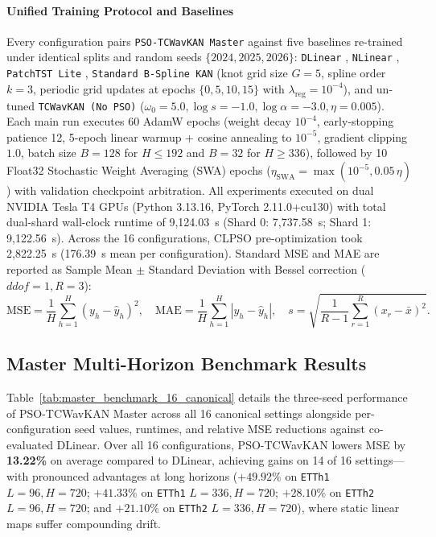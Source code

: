 \documentclass[pdflatex,sn-mathphys-num,referee,lineno]{sn-jnl}
\theoremstyle{thmstyleone}
\theoremstyle{thmstyletwo}
\theoremstyle{thmstylethree}
\begin{document}
\paragraph{Unified Training Protocol and Baselines}
Every configuration pairs \texttt{PSO-TCWavKAN Master} against five baselines re-trained under identical splits and random seeds $\{2024, 2025, 2026\}$: \texttt{DLinear} \cite{zeng2023dlinear}, \texttt{NLinear} \cite{zeng2023dlinear}, \texttt{PatchTST Lite} \cite{nie2023patchtst}, \texttt{Standard B-Spline KAN} (knot grid size $G=5$, spline order $k=3$, periodic grid updates at epochs $\{0, 5, 10, 15\}$ with $\lambda_{\mathrm{reg}}=10^{-4}$), and un-tuned \texttt{TCWavKAN (No PSO)} ($\omega_0=5.0, \log s=-1.0, \log\alpha=-3.0, \eta=0.005$). Each main run executes 60 AdamW epochs \cite{loshchilov2019adamw} (weight decay $10^{-4}$, early-stopping patience 12, 5-epoch linear warmup + cosine annealing to $10^{-5}$, gradient clipping $1.0$, batch size $B=128$ for $H \le 192$ and $B=32$ for $H \ge 336$), followed by 10 Float32 Stochastic Weight Averaging (SWA) epochs \cite{izmailov2018swa} ($\eta_{\mathrm{SWA}} = \max(10^{-5}, 0.05\,\eta)$) with validation checkpoint arbitration. All experiments executed on dual NVIDIA Tesla T4 GPUs (Python 3.13.16, PyTorch 2.11.0+cu130) with total dual-shard wall-clock runtime of 9,124.03~s (Shard 0: 7,737.58~s; Shard 1: 9,122.56~s). Across the 16 configurations, CLPSO pre-optimization took 2,822.25~s (176.39~s mean per configuration). Standard MSE and MAE are reported as Sample Mean $\pm$ Standard Deviation with Bessel correction ($ddof=1, R=3$):
\begin{equation}
\mathrm{MSE} = \frac{1}{H} \sum_{h=1}^H (y_h - \hat{y}_h)^2, \quad \mathrm{MAE} = \frac{1}{H} \sum_{h=1}^H |y_h - \hat{y}_h|, \quad s = \sqrt{\frac{1}{R-1} \sum_{r=1}^R (x_r - \bar{x})^2}.
\label{eq:metrics}
\end{equation}

\subsection{Master Multi-Horizon Benchmark Results}\label{subsec:master_benchmark}
Table~\ref{tab:master_benchmark_16_canonical} details the three-seed performance of PSO-TCWavKAN Master across all 16 canonical settings alongside per-configuration seed values, runtimes, and relative MSE reductions against co-evaluated DLinear. Over all 16 configurations, PSO-TCWavKAN lowers MSE by \textbf{13.22\%} on average compared to DLinear, achieving gains on 14 of 16 settings---with pronounced advantages at long horizons ($+49.92\%$ on \texttt{ETTh1} $L=96, H=720$; $+41.33\%$ on \texttt{ETTh1} $L=336, H=720$; $+28.10\%$ on \texttt{ETTh2} $L=96, H=720$; and $+21.10\%$ on \texttt{ETTh2} $L=336, H=720$), where static linear maps suffer compounding drift.
\end{document}
